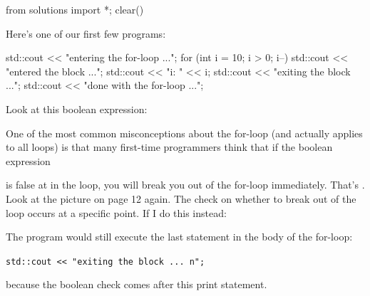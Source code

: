 \begin{python0}
from solutions import *; clear()
\end{python0}

Here's one of our first few programs:
\begin{console}
std::cout << "entering the for-loop ...\n";
for (int i = 10; i > 0; i--)
{   
    std::cout << "entered the block ...\n";
    std::cout << "i: " << i;
    std::cout << "exiting the block ...\n";
}
std::cout << "done with the for-loop ...\n";
\end{console}

Look at this boolean expression:
One of the most common misconceptions about the for-loop (and actually
applies to all loops) is that many first-time programmers think that if
the boolean expression
\begin{center}
\end{center}
is false at  in the loop, you will break you out of
the for-loop immediately. That's . Look
at the picture on page 12 again. The check on whether to break out of
the loop occurs at a specific point. If I do this instead:


The program would still execute the last statement in the body of the
for-loop:
\begin{center}
\texttt{std::cout << "exiting the block ...\ n";}
\end{center}
because the boolean check comes after this print statement.
\begin{center}
\end{center}

